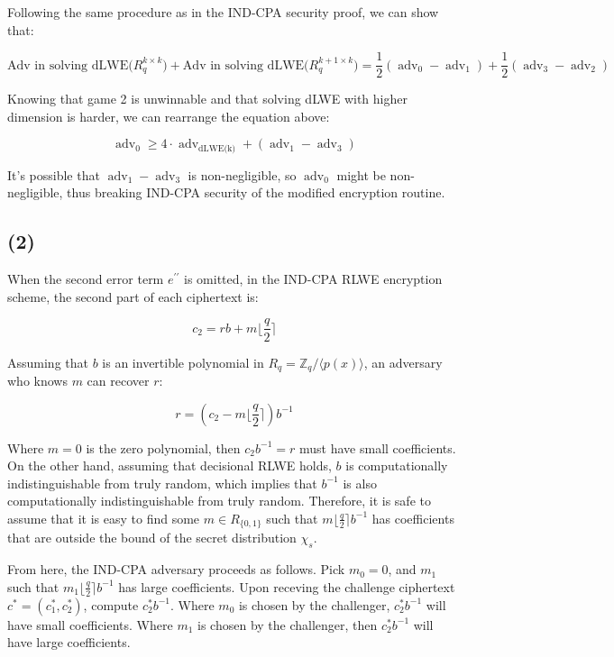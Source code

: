 \documentclass{article}
\newcommand{\round}[1]{\lfloor {#1} \rceil}
\begin{document}
Following the same procedure as in the IND-CPA security proof, we can show that:

$$
\text{Adv in solving dLWE($R_q^{k \times k}$)} + 
\text{Adv in solving dLWE($R_q^{k+1 \times k}$)}
= \frac{1}{2}(\operatorname{adv}_0 - \operatorname{adv}_1) 
+ \frac{1}{2}(\operatorname{adv}_3 - \operatorname{adv}_2)
$$

Knowing that game 2 is unwinnable and that solving dLWE with higher dimension is harder, we can rearrange the equation above:

$$
\operatorname{adv}_0 
\geq 4 \cdot \operatorname{adv}_\text{dLWE(k)} + (\operatorname{adv}_1 - \operatorname{adv}_3)
$$

It's possible that $\operatorname{adv}_1 - \operatorname{adv}_3$ is non-negligible, so $\operatorname{adv}_0$ might be non-negligible, thus breaking IND-CPA security of the modified encryption routine.

\subsection*{(2)}
When the second error term $e^{\prime\prime}$ is omitted, in the IND-CPA RLWE encryption scheme, the second part of each ciphertext is:

$$
c_2 = rb + m \round{\frac{q}{2}}
$$

Assuming that $b$ is an invertible polynomial in $R_q = \mathbb{Z}_q / \langle p(x) \rangle$, an adversary who knows $m$ can recover $r$:

$$
r = (c_2 - m \round{\frac{q}{2}})b^{-1}
$$

Where $m = 0$ is the zero polynomial, then $c_2b^{-1} = r$ must have small coefficients. On the other hand, assuming that decisional RLWE holds, $b$ is computationally indistinguishable from truly random, which implies that $b^{-1}$ is also computationally indistinguishable from truly random. Therefore, it is safe to assume that it is easy to find some $m \in R_{\{0, 1\}}$ such that $m\round{\frac{q}{2}}b^{-1}$ has coefficients that are outside the bound of the secret distribution $\chi_s$.

From here, the IND-CPA adversary proceeds as follows. Pick $m_0 = 0$, and $m_1$ such that $m_1 \round{\frac{q}{2}}b^{-1}$ has large coefficients. Upon receving the challenge ciphertext $c^\ast  =(c_1^\ast, c_2^\ast)$, compute $c_2^\ast b^{-1}$. Where $m_0$ is chosen by the challenger, $c_2^\ast b^{-1}$ will have small coefficients. Where $m_1$ is chosen by the challenger, then $c_2^\ast b^{-1}$ will have large coefficients.
\end{document}
